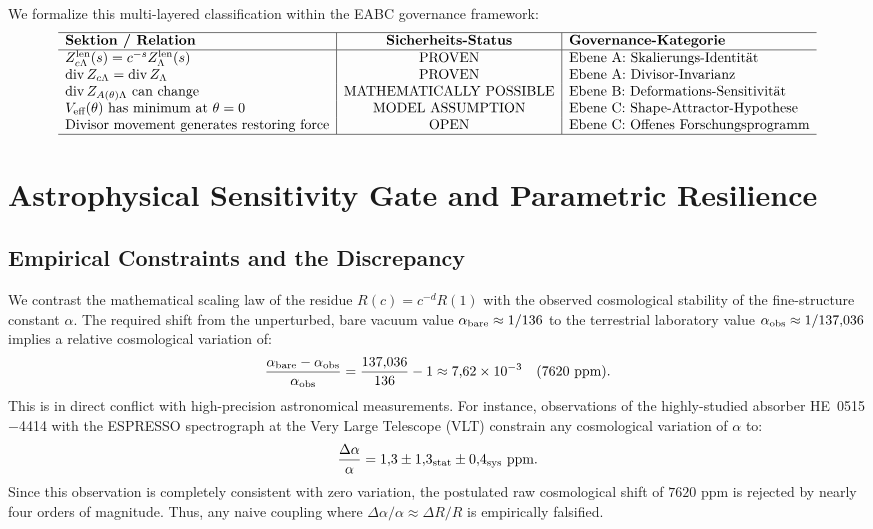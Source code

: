 \documentclass[11pt,a4paper]{article}
\theoremstyle{definition}
\begin{document}
	We formalize this multi-layered classification within the EABC governance framework:
	\begin{equation}
		\begin{array}{l|c|l}
			\hline
			\textbf{Sektion / Relation} & \textbf{Sicherheits-Status} & \textbf{Governance-Kategorie} \\
			\hline
			Z_{c\Lambda}^{\mathrm{len}}(s) = c^{-s}Z_\Lambda^{\mathrm{len}}(s) & \mathrm{PROVEN} & \text{Ebene A: Skalierungs-Identität} \\
			\operatorname{div} Z_{c\Lambda} = \operatorname{div} Z_\Lambda & \mathrm{PROVEN} & \text{Ebene A: Divisor-Invarianz} \\
			\operatorname{div} Z_{A(\theta)\Lambda} \text{ can change} & \mathrm{MATHEMATICALLY\ POSSIBLE} & \text{Ebene B: Deformations-Sensitivität} \\
			V_{\text{eff}}(\theta) \text{ has minimum at } \theta=0 & \mathrm{MODEL\ ASSUMPTION} & \text{Ebene C: Shape-Attractor-Hypothese} \\
			\text{Divisor movement generates restoring force} & \mathrm{OPEN} & \text{Ebene C: Offenes Forschungsprogramm} \\
			\hline
		\end{array}
	\end{equation}
	
	\section{Astrophysical Sensitivity Gate and Parametric Resilience}
	\label{sec:astrophysical_sensitivity_gate}
	
	\subsection{Empirical Constraints and the Discrepancy}
	We contrast the mathematical scaling law of the residue $R(c) = c^{-d}R(1)$ with the observed cosmological stability of the fine-structure constant $\alpha$. The required shift from the unperturbed, bare vacuum value $\alpha_{\rm bare} \approx 1/136$ to the terrestrial laboratory value $\alpha_{\rm obs} \approx 1/137{,}036$ implies a relative cosmological variation of:
	\begin{equation}
		\frac{\alpha_{\rm bare} - \alpha_{\rm obs}}{\alpha_{\rm obs}} = \frac{137{,}036}{136} - 1 \approx 7{,}62 \times 10^{-3} \quad (7620\text{ ppm}).
	\end{equation}
	This is in direct conflict with high-precision astronomical measurements. For instance, observations of the highly-studied absorber HE~0515$-$4414 with the ESPRESSO spectrograph at the Very Large Telescope (VLT) constrain any cosmological variation of $\alpha$ to:
	\begin{equation}
		\frac{\Delta\alpha}{\alpha} = 1{,}3 \pm 1{,}3_{\rm stat} \pm 0{,}4_{\rm sys} \text{ ppm}.
	\end{equation}
	Since this observation is completely consistent with zero variation, the postulated raw cosmological shift of $7620$ ppm is rejected by nearly four orders of magnitude. Thus, any naive coupling where $\Delta\alpha/\alpha \approx \Delta R/R$ is empirically falsified.
	
\end{document}

